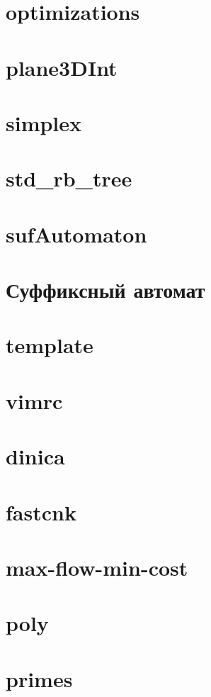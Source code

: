 \documentclass[portrait,twocolumn,letterpaper]{article}
\begin{document}
\section{optimizations}


\section{plane3DInt}


\section{simplex}


\section{std\_rb\_tree}


\section{sufAutomaton}



\section{Суффиксный автомат}


\section{template}


\section{vimrc}


\section{dinica}


\section{fastcnk}


\section{max-flow-min-cost}


\section{poly}


\section{primes}






\end{document}
